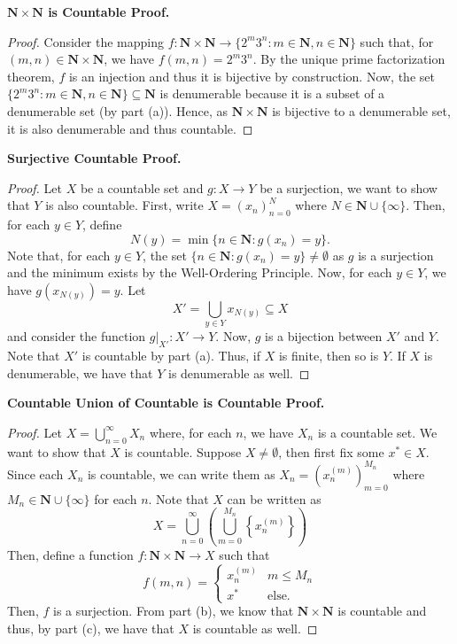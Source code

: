 \documentclass[11pt]{article} %
\theoremstyle{plain}
\newcommand{\N}{\mathbf{N}}
\begin{document}
\textbf{$\N\times\N$ is Countable Proof.}

\begin{proof}
Consider the mapping $f:\N\times \N\to \{2^m3^n : m\in \N, n\in\N\}$ such that, for $(m,n)\in \N\times\N$, we have $f(m,n) = 2^m3^n$. By the unique prime factorization theorem, $f$ is an injection and thus it is bijective by construction. Now, the set $\{2^m3^n : m\in \N, n\in\N\} \subseteq \N$ is denumerable because it is a subset of a denumerable set (by part (a)). Hence, as $\N\times \N$ is bijective to a denumerable set, it is also denumerable and thus countable.
\end{proof}

\textbf{Surjective Countable Proof.}

\begin{proof}
Let $X$ be a countable set and $g:X\to Y$ be a surjection, we want to show that $Y$ is also countable. First, write $X = (x_n)_{n=0}^N$ where $N \in \N \cup \{\infty\}$. Then, for each $y\in Y$, define
\[N(y) = \min\{n\in \N : g(x_n)=y\}.\]
Note that, for each $y\in Y$, the set $\{n\in \N : g(x_n)=y\}\neq \emptyset$ as $g$ is a surjection and the minimum exists by the Well-Ordering Principle. Now, for each $y\in Y$, we have $g(x_{N(y)}) = y$. Let
\[X' = \bigcup_{y\in Y} x_{N(y)}\subseteq X\]
and consider the function $g\big|_{X'}:X'\to Y$. Now, $g$ is a bijection between $X'$ and $Y$. Note that $X'$ is countable by part (a). Thus, if $X$ is finite, then so is $Y$. If $X$ is denumerable, we have that $Y$ is denumerable as well.
\end{proof}

\textbf{Countable Union of Countable is Countable Proof.}

\begin{proof}
Let $X= \bigcup_{n=0}^\infty X_n$ where, for each $n$, we have $X_n$ is a countable set. We want to show that $X$ is countable. Suppose $X\neq \emptyset$, then first fix some $x^*\in X$. Since each $X_n$ is countable, we can write them as $X_n = \left(x_n^{(m)}\right)_{m=0}^{M_n}$ where $M_n\in \N\cup\{\infty\}$ for each $n$. Note that $X$ can be written as
\[X=\bigcup_{n=0}^\infty\left(\bigcup_{m=0}^{M_n} \left\{x_n^{(m)}\right\}\right)\] 
Then, define a function $f:\N\times\N\to X$ such that
\[f(m,n) =
\begin{cases}
x_n^{(m)} & m\leq M_n \\
x^*  & \text{else.}
\end{cases}
\]
Then, $f$ is a surjection. From part (b), we know that $\N\times\N$ is countable and thus, by part (c), we have that $X$ is countable as well.
\end{proof}
\end{document}
